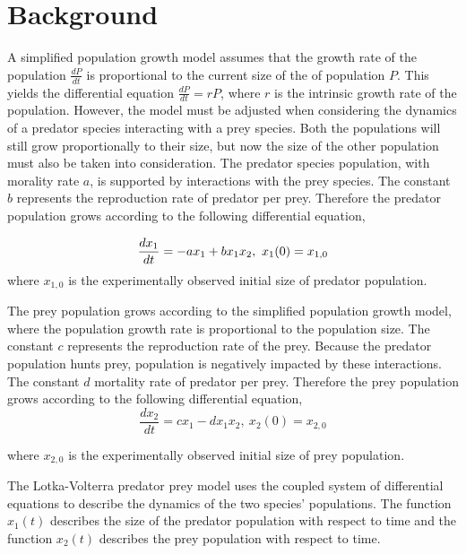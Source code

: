 \documentclass[12pt]{article}   %
\theoremstyle{definition}
\numberwithin{equation}{section}
\begin{document}
\section{Background} \label{APPM2360proj01sec01}
\quad A simplified population growth model assumes that the growth rate of the population $\frac{dP}{dt}$ is proportional to the current size of the of population $P$. This yields the differential equation $\frac{dP}{dt}=rP$, where $r$ is the intrinsic growth rate of the population. However, the model must be adjusted when considering the dynamics of a predator species interacting with a prey species. Both the populations will still grow proportionally to their size, but now the size of the other population must also be taken into consideration. The predator species population, with morality rate $a$, is supported by interactions with the prey species. The constant $b$ represents the reproduction rate of predator per prey. Therefore the predator population grows according to the following differential equation, 

\begin{equation}
  \frac{dx_1}{dt} = -ax_1 + bx_1x_2 ,\ x_1(0) = x_{1,0}\\
  \label{eq:1}
\end{equation}
where $x_{1,0}$ is the experimentally observed initial size of predator population. 

\quad The prey population grows according to the simplified population growth model, where the population growth rate is proportional to the population size. The constant $c$ represents the reproduction rate of the prey. Because the predator population hunts prey, population is negatively impacted by these interactions. The constant $d$ mortality rate of predator per prey. Therefore the prey population grows according to the following differential equation,
\begin{equation}
  \frac{dx_2}{dt} = cx_1 - dx_1x_2 ,\ x_2(0) = x_{2,0} 
  \label{eq:2}
\end{equation}

where $x_{2,0}$ is the experimentally observed initial size of prey population. 

\quad The Lotka-Volterra predator prey model uses the coupled system of differential equations to describe the dynamics of the two species' populations. The function $x_1(t)$ describes the size of the predator population with respect to time and the function $x_2(t)$ describes the prey population with respect to time. 
\end{document}
